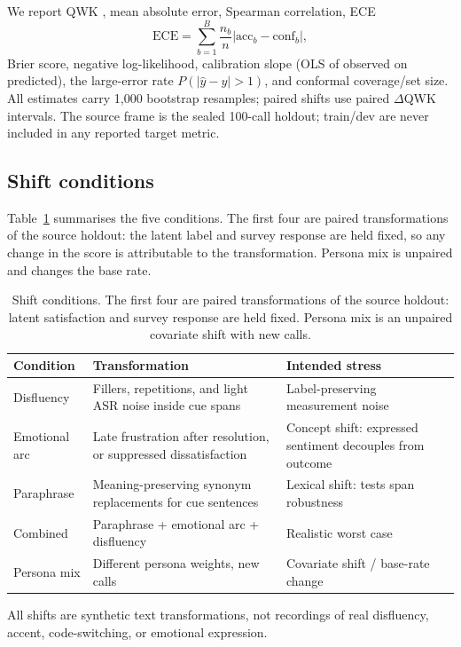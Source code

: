 \documentclass[11pt,a4paper]{article}
\newcommand{\ece}{\mathrm{ECE}}
\begin{document}
We report QWK \citep{cohen1968weighted}, mean absolute error, Spearman correlation, ECE
\begin{equation}
\ece = \sum_{b=1}^{B}\frac{n_b}{n}\left|\mathrm{acc}_b-\mathrm{conf}_b\right|,
\label{eq:ece}
\end{equation}
Brier score, negative log-likelihood, calibration slope (OLS of observed on predicted), the
large-error rate $P(|\hat y-y|>1)$, and conformal coverage/set size. All estimates carry 1,000
bootstrap resamples; paired shifts use paired $\Delta$QWK intervals. The source frame is the
sealed 100-call holdout; train/dev are never included in any reported target metric.

\subsection{Shift conditions}

Table~\ref{tab:shifts} summarises the five conditions. The first four are paired transformations
of the source holdout: the latent label and survey response are held fixed, so any change in the
score is attributable to the transformation. Persona mix is unpaired and changes the base rate.

\begin{table}[t]
\centering
\caption{Shift conditions. The first four are paired transformations of the source holdout:
latent satisfaction and survey response are held fixed. Persona mix is an unpaired covariate
shift with new calls.}
\label{tab:shifts}
\begin{threeparttable}
\begin{tabularx}{\textwidth}{@{}l X X@{}}
\toprule
Condition & Transformation & Intended stress \\
\midrule
Disfluency & Fillers, repetitions, and light ASR noise inside cue spans & Label-preserving measurement noise \\
Emotional arc & Late frustration after resolution, or suppressed dissatisfaction & Concept shift: expressed sentiment decouples from outcome \\
Paraphrase & Meaning-preserving synonym replacements for cue sentences & Lexical shift: tests span robustness \\
Combined & Paraphrase + emotional arc + disfluency & Realistic worst case \\
Persona mix & Different persona weights, new calls & Covariate shift / base-rate change \\
\bottomrule
\end{tabularx}
\begin{tablenotes}\footnotesize
\item All shifts are synthetic text transformations, not recordings of real disfluency, accent,
code-switching, or emotional expression.
\end{tablenotes}
\end{threeparttable}
\end{table}
\end{document}
